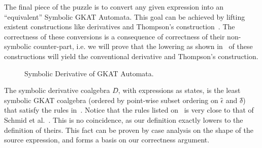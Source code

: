 \documentclass[conference]{IEEEtran}
\newcommand\altxrightarrow[2][0pt]{\mathrel{\ensurestackMath{\stackengine%
  {\dimexpr#1-7.5pt}{\xrightarrow{\phantom{#2}}}{\scriptstyle\!#2\,}%
  {O}{c}{F}{F}{S}}}}
\newcommand{\transvia}[1]{
    \mathrel{\raisebox{-2px}{\(\altxrightarrow[-2px]{#1}\)}}
}
\newcommand{\transAcc}[2]{⇒_{#1} #2}
\begin{document}
The final piece of the puzzle is to convert any given expression into an ``equivalent'' Symbolic GKAT Automata. This goal can be achieved by lifting existent constructions like derivatives and Thompson's construction~\cite{schmid_GuardedKleeneAlgebra_2021,smolka_GuardedKleeneAlgebra_2020}.
The correctness of these conversions is a consequence of  correctness of their non-symbolic counter-part, i.e. we will prove that the lowering as shown in~ of these constructions will yield the conventional derivative and Thompson's construction. 

\begin{figure*}
    \caption{Symbolic Derivative of GKAT Automata.}\label{fig:derivatives-rules}
\end{figure*}

The symbolic derivative coalgebra \(D̂\), with expressions as states, is the least symbolic GKAT coalgebra (ordered by point-wise subset ordering on \(ϵ̂\) and \(δ̂\)) that satisfy the rules in~.
Notice that the rules listed on~ is very close to that of Schmid et al.~\cite{schmid_GuardedKleeneAlgebra_2021}.
This is no coincidence, as our definition exactly lowers to the definition of theirs.
This fact can be proven by case analysis on the shape of the source expression, and forms a basis on our correctness argument.
\end{document}
